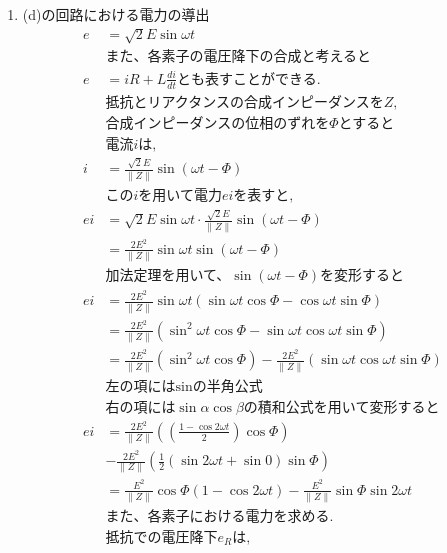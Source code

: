 \documentclass[twocolumn]{article}
\begin{document}
\begin{enumerate}
    \item (d)の回路における電力の導出
    \begin{align*}
      e   &=\sqrt{2}E\sin\omega t\\
      &\text{また、各素子の電圧降下の合成と考えると}\\
      e   &=iR + L \frac{di}{dt} \text{とも表すことができる.} \\
      &\text{抵抗とリアクタンスの合成インピーダンスを} Z \text{,}\\
      &\text{合成インピーダンスの位相のずれを} \Phi \text{とすると}\\
      &\text{電流} i \text{は,}\\
      i   &= \frac{\sqrt{2}E}{\|Z\|} \sin \left( \omega t - \Phi\right)\\
      &\text{この} i \text{を用いて電力} ei \text{を表すと,}\\
      ei  &= \sqrt{2}E\sin\omega t \cdot \frac{\sqrt{2}E}{\|Z\|} \sin \left( \omega t - \Phi\right) \\
          &= \frac{2E^2}{\|Z\|}\sin\omega t \sin \left(\omega t - \Phi\right)\\
      &\text{加法定理を用いて、}\sin \left(\omega t - \Phi\right) \text{を変形すると}\\
      ei  &= \frac{2E^2}{\|Z\|}\sin\omega t \left(\sin\omega t \cos \Phi - \cos\omega t \sin \Phi\right)\\
          &= \frac{2E^2}{\|Z\|} \left(\sin^2 \omega t \cos \Phi - \sin\omega t \cos\omega t \sin \Phi\right)\\
          &= \frac{2E^2}{\|Z\|} \left(\sin^2 \omega t \cos \Phi \right) - \frac{2E^2}{\|Z\|} \left(\sin\omega t \cos\omega t \sin \Phi\right)\\
      &\text{左の項にはsinの半角公式}\\
      &\text{右の項には} \sin \alpha \cos \beta \text{の積和公式を用いて変形すると}\\
      ei  &= \frac{2E^2}{\|Z\|} \left(\left(\frac{1-\cos2\omega t}{2}\right)\cos \Phi\right)\\
          &- \frac{2E^2}{\|Z\|}\left(\frac{1}{2}\left(\sin2\omega t + \sin0\right) \sin \Phi\right)\\
          &= \frac{E^2}{\|Z\|} \cos \Phi \left(1-\cos2\omega t\right) - \frac{E^2}{\|Z\|} \sin \Phi\sin2\omega t \\
      &\text{また、各素子における電力を求める.}\\
          &\text{抵抗での電圧降下}e_R \text{は,}\\

\end{align*}
\end{enumerate}
\end{document}
